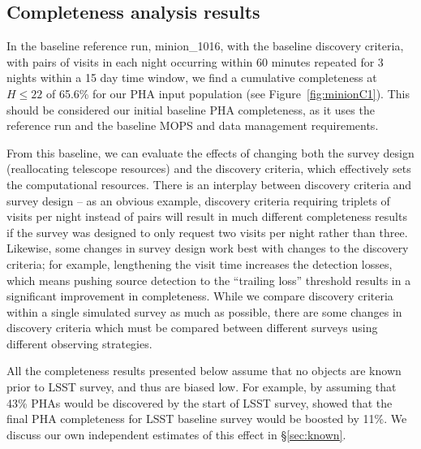 \subsection{Completeness analysis results}

In the baseline reference run, minion\_1016, with the baseline discovery
criteria, with pairs of visits in each night occurring within 60 minutes
repeated for 3 nights within a 15 day time window, we find a cumulative
completeness at $H\le22$ of 65.6\% for our PHA input population (see
Figure~\ref{fig:minionC1}). This should be considered our initial baseline PHA
completeness, as it uses the reference run and the baseline MOPS and data
management requirements.

From this baseline, we can evaluate the effects of changing both the survey design (reallocating telescope resources) and the discovery criteria, which effectively sets the computational resources.
There is an interplay between discovery criteria and survey design -- as an obvious example, discovery criteria requiring triplets of visits per night instead of pairs will result in much different completeness results if the survey was designed to only request two visits per night rather than three. Likewise, some changes in survey design work best with changes to the discovery criteria; for example, lengthening the visit time increases the detection losses, which means pushing source detection to the ``trailing loss'' threshold results in a significant improvement in completeness. While we compare discovery criteria within a single simulated survey as much as possible, there are some changes in discovery criteria which must be compared between different surveys using different observing strategies.

All the completeness results presented below assume that no objects are known prior to LSST survey,
and thus are biased low. For example, by assuming that 43\% PHAs would be discovered by the start of
LSST survey, \cite{GMS2016} showed that the final PHA completeness for LSST baseline survey would
be boosted by 11\%. We discuss our own independent estimates of this effect in \S\ref{sec:known}.

